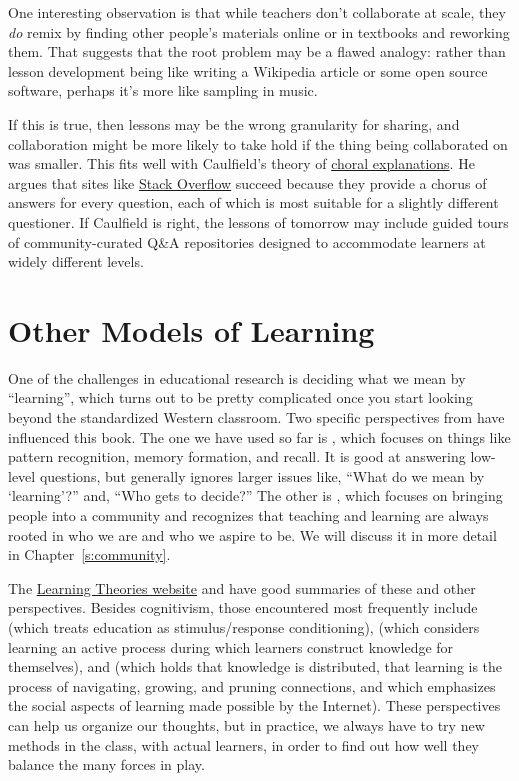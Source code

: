 One interesting observation is that while teachers don't collaborate
at scale, they \emph{do} remix by finding other people's materials online
or in textbooks and reworking them. That suggests that the root
problem may be a flawed analogy: rather than lesson development being
like writing a Wikipedia article or some open source software, perhaps
it's more like sampling in music.

If this is true, then lessons may be the wrong granularity for
sharing, and collaboration might be more likely to take hold if the
thing being collaborated on was smaller. This fits well with
Caulfield's theory of \href{https://hapgood.us/2016/05/13/choral-explanations/}{choral explanations}. He
argues that sites like \href{https://stackoverflow.com/}{Stack Overflow} succeed
because they provide a chorus of answers for every question, each of
which is most suitable for a slightly different questioner. If
Caulfield is right, the lessons of tomorrow may include guided tours
of community-curated Q\&A repositories designed to accommodate learners
at widely different levels.

\section{Other Models of Learning}\label{s:process-theory}

One of the challenges in educational research is deciding what we mean by ``learning'',
which turns out to be pretty complicated
once you start looking beyond the standardized Western classroom.
Two specific perspectives from 
have influenced this book.
The one we have used so far is ,
which focuses on things like pattern recognition, memory formation, and recall.
It is good at answering low-level questions,
but generally ignores larger issues like,
``What do we mean by `learning'?'' and, ``Who gets to decide?''
The other is ,
which focuses on bringing people into a community
and recognizes that
teaching and learning are always rooted in who we are and who we aspire to be.
We will discuss it in more detail in Chapter~\ref{s:community}.

The \href{http://www.learning-theories.com/}{Learning Theories website} and \cite{Wibu2016}
have good summaries of these and other perspectives.
Besides cognitivism,
those encountered most frequently include 
(which treats education as stimulus/response conditioning),
(which considers learning an active process during which learners construct knowledge for themselves),
and 
(which holds that knowledge is distributed,
that learning is the process of navigating, growing, and pruning connections,
and which emphasizes the social aspects of learning made possible by the Internet).
These perspectives can help us organize our thoughts,
but in practice,
we always have to try new methods in the class,
with actual learners,
in order to find out how well they balance the many forces in play.

